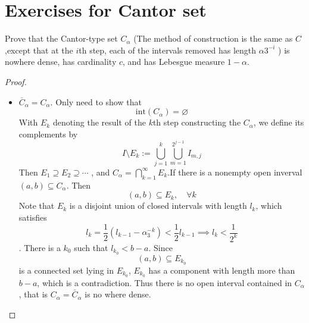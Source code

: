 \documentclass[../main.tex]{subfiles}
\begin{document}
\section*{Exercises for Cantor set}
\begin{exercise}{}{}
    Prove that the Cantor-type set $C_\alpha$ (The method of construction is the same as \(  C  \),except that at the \(  i  \)th step, each of the intervals removed has length \(  \alpha 3 ^{-i}  \)   ) is nowhere dense, has cardinality $c$, and has Lebesgue measure $1 - \alpha$. 
\end{exercise}
\begin{proof}
\begin{itemize}
    \item     \(  \overline{C}_{\alpha }= C_{\alpha }  \). Only need to show that \[
    \mathrm{int}\left( C_{\alpha } \right)= \varnothing 
    \]  With \(  E_{k}  \) denoting the result of the \(  k  \)th step constructing the \(  C_{\alpha }  \), we define its complements by \[
   I\setminus E_{k}:=  \bigcup _{j = 1}^{k} \bigcup _{m = 1}^{2^{j-1}}I_{m,j}
   \]    Then  \(  E_1\supseteq E_2\supseteq \cdots   \) , and \(  C _{\alpha }= \bigcap_{k = 1}^{\infty}E_{k}   \).If there is a nonempty open inverval \(  (a,b)\subseteq C_{\alpha }  \). Then \[
   \left( a,b \right)\subseteq E_{k},\quad \forall k 
   \] Note that \(  E_{k}  \) is a disjoint union of closed intervals with length \(  l_{k}  \), which satisfies \[
   l_{k}= \frac{1}{2}\left( l_{k-1}-\alpha _3 ^{-k} \right)< \frac{1 }{2 }l_{k-1}  \implies l_{k}< \frac{1 }{2^{k} } 
   \] . There is a \(  k_0  \) such that \( l_{k_0}< b-a \). Since \[
   \left( a,b \right)\subseteq E_{k_0} 
   \]   is a connected set lying in \(  E_{k_0}  \), \(  E_{k_0}  \) has a component with length more than \(  b-a  \), which is a contradiction.  Thus there is no open interval contained in \(  C_{\alpha }  \), that is \(  C_{\alpha }= \bar{C}_{\alpha } \) is no where dense.  
 

\end{itemize}
\end{proof}
\end{document}

